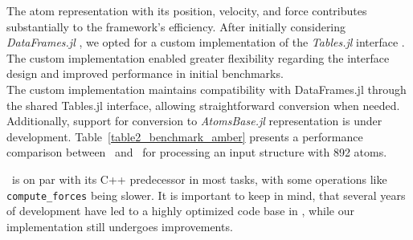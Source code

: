 The atom representation with its position, velocity, and force contributes substantially to the framework's efficiency. After initially considering \textit{DataFrames.jl} \cite{Bouchet-Valat2023}, we opted for a custom implementation of the \textit{Tables.jl} interface \cite{BouchetValat2018}. The custom implementation enabled greater flexibility regarding the interface design and improved performance in initial benchmarks.\\
The custom implementation maintains compatibility with DataFrames.jl through the shared Tables.jl interface, allowing straightforward conversion when needed. Additionally, support for conversion to \textit{AtomsBase.jl} representation is under development. Table~\ref{table2_benchmark_amber} presents a performance comparison between \ball\ and \biochem\ for processing an input structure with 892 atoms. 

\biochem\ is on par with its C++ predecessor in most tasks, with some operations like \texttt{compute\_forces} being slower. It is important to keep in mind, that several years of development have led to a highly optimized code base in \ball, while our implementation still undergoes improvements.
 
\begin{table}
	\label{table2_benchmark_amber}
\end{table}
 


